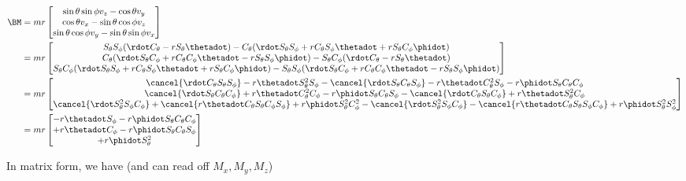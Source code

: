 \begin{align*}
\BM &=
m r
\begin{bmatrix}
\sin\theta \sin\phi v_z - \cos\theta v_y \\
\cos\theta v_x - \sin\theta \cos\phi v_z \\
\sin\theta \cos\phi v_y - \sin\theta \sin\phi v_x
\end{bmatrix} \\
&=
m r
\begin{bmatrix}
S_\theta S_\phi (\rdot C_\theta -r S_\theta \thetadot) - C_\theta (\rdot S_\theta S_\phi + r C_\theta S_\phi \thetadot + r S_\theta C_\phi \phidot) \\
C_\theta (\rdot S_\theta C_\phi + r C_\theta C_\phi \thetadot - r S_\theta S_\phi \phidot) - S_\theta C_\phi (\rdot C_\theta -r S_\theta \thetadot) \\
S_\theta C_\phi (\rdot S_\theta S_\phi + r C_\theta S_\phi \thetadot + r S_\theta C_\phi \phidot) - S_\theta S_\phi (\rdot S_\theta C_\phi + r C_\theta C_\phi \thetadot - r S_\theta S_\phi \phidot)
\end{bmatrix} \\
&=
m r
\begin{bmatrix}
\cancel{\rdot C_\theta S_\theta S_\phi }
- r \thetadot S_\theta^2 S_\phi
- \cancel{\rdot S_\theta C_\theta S_\phi }
- r \thetadot C_\theta^2 S_\phi
- r \phidot S_\theta C_\theta C_\phi
\\
\cancel{\rdot S_\theta C_\theta C_\phi }
+ r \thetadot C_\theta^2 C_\phi
- r \phidot S_\theta C_\theta S_\phi
-\cancel{\rdot C_\theta S_\theta C_\phi }
+r \thetadot S_\theta^2 C_\phi
\\
\cancel{\rdot S_\theta^2 S_\phi C_\phi }
+ \cancel{r \thetadot C_\theta S_\theta C_\phi S_\phi }
+ r \phidot S_\theta^2 C_\phi^2
- \cancel{\rdot S_\theta^2 S_\phi C_\phi }
- \cancel{r \thetadot C_\theta S_\theta S_\phi C_\phi }
+ r \phidot S_\theta^2 S_\phi^2
\end{bmatrix} \\
&=
m r
\begin{bmatrix}
- r \thetadot S_\phi
- r \phidot S_\theta C_\theta C_\phi
\\
+ r \thetadot C_\phi
- r \phidot S_\theta C_\theta S_\phi
\\
+ r \phidot S_\theta^2
\end{bmatrix} \\
\end{align*}

In matrix form, we have (and can read off $M_x, M_y, M_z$)

